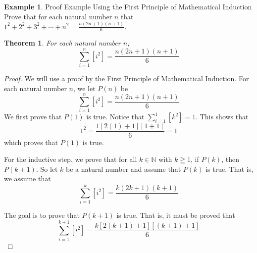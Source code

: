 \documentclass{book}
\newtheorem{theorem}{Theorem}[section]
\theoremstyle{definition}
\newtheorem{example}{Example}[definition]
\theoremstyle{remark}
\newcommand{\bb}[1]{\mathbb{#1}}
\begin{document}
\newpage
\begin{example}
Proof Example Using the First Principle of Mathematical Induction \\

Prove that for each natural number $n$ that $1^2 + 2^2 + 3^2 + \cdots + n^2 = \frac{n(2n+1)(n+1)}{6}$. 
    \begin{tcolorbox}
        \begin{theorem}
            For each natural number $n$,
                \begin{equation*}
                    \sum_{i=1}^{n}{[i^2]} = \frac{n(2n+1)(n+1)}{6} 
                \end{equation*}
        \end{theorem}
    \end{tcolorbox}

    \begin{proof}
        We will use a proof by the First Principle of Mathematical Induction. For each natural number $n$, we let $P(n)$ be
            \begin{equation*}
                \sum_{i=1}^{n}{[i^2]} = \frac{n(2n+1)(n+1)}{6} 
            \end{equation*}
        We first prove that $P(1)$ is true. Notice that $\sum_{i=1}^{1}{[k^2]} = 1$. This shows that   
            \begin{equation*}
                 1^2 = \frac{1[2(1)+1][1+1]}{6} = 1
            \end{equation*}
        which proves that $P(1)$ is true. 
        
        For the inductive step, we prove that for all $k \in \bb{N}$ with $k \geqq 1$, if $P(k)$, then $P(k+1)$. So let $k$ be a natural number and assume that $P(k)$ is true. That is, we assume that 
            \begin{equation*}
               \sum_{i=1}^{k}{[i^2]} = \frac{k(2k+1)(k+1)}{6} 
            \end{equation*}
        
        The goal is to prove that $P(k+1)$ is true. That is, it must be proved that  
            \begin{equation}
            \label{dnef}
                \sum_{i=1}^{k+1}{[i^2]}  = \frac{k[2(k+1)+1][(k+1)+1]}{6} 
            \end{equation}
        

\end{proof}
\end{example}
\end{document}
